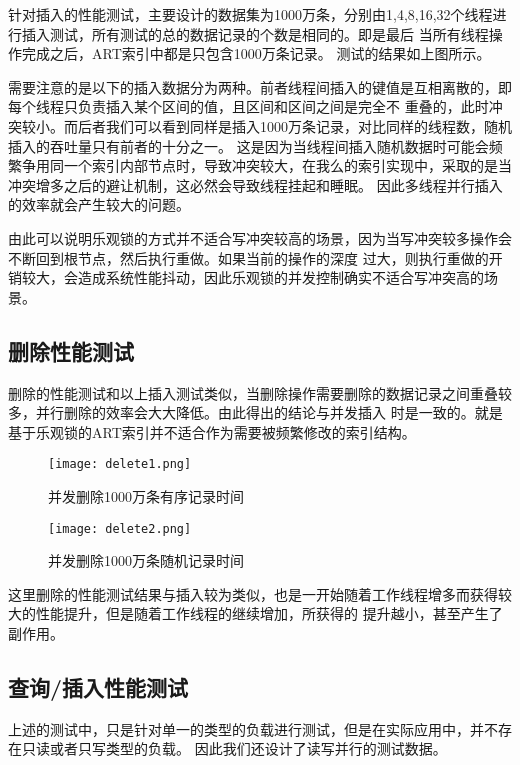 针对插入的性能测试，主要设计的数据集为1000万条，分别由1,4,8,16,32个线程进行插入测试，所有测试的总的数据记录的个数是相同的。即是最后
当所有线程操作完成之后，ART索引中都是只包含1000万条记录。
测试的结果如上图所示。

需要注意的是以下的插入数据分为两种。前者线程间插入的键值是互相离散的，即每个线程只负责插入某个区间的值，且区间和区间之间是完全不
重叠的，此时冲突较小。而后者我们可以看到同样是插入1000万条记录，对比同样的线程数，随机插入的吞吐量只有前者的十分之一。
这是因为当线程间插入随机数据时可能会频繁争用同一个索引内部节点时，导致冲突较大，在我么的索引实现中，采取的是当冲突增多之后的避让机制，这必然会导致线程挂起和睡眠。
因此多线程并行插入的效率就会产生较大的问题。

由此可以说明乐观锁的方式并不适合写冲突较高的场景，因为当写冲突较多操作会不断回到根节点，然后执行重做。如果当前的操作的深度
过大，则执行重做的开销较大，会造成系统性能抖动，因此乐观锁的并发控制确实不适合写冲突高的场景。

\subsection{删除性能测试}

删除的性能测试和以上插入测试类似，当删除操作需要删除的数据记录之间重叠较多，并行删除的效率会大大降低。由此得出的结论与并发插入
时是一致的。就是基于乐观锁的ART索引并不适合作为需要被频繁修改的索引结构。

\begin{figure}[H]
  \centering
  \texttt{[image: delete1.png]}
  \caption{并发删除1000万条有序记录时间}
  \label{fig:cc-delete-1}
\end{figure}

\begin{figure}[H]
  \centering
  \texttt{[image: delete2.png]}
  \caption{并发删除1000万条随机记录时间}
  \label{fig:cc-delete-2}
\end{figure}

这里删除的性能测试结果与插入较为类似，也是一开始随着工作线程增多而获得较大的性能提升，但是随着工作线程的继续增加，所获得的
提升越小，甚至产生了副作用。

\subsection{查询/插入性能测试}

上述的测试中，只是针对单一的类型的负载进行测试，但是在实际应用中，并不存在只读或者只写类型的负载。
因此我们还设计了读写并行的测试数据。

